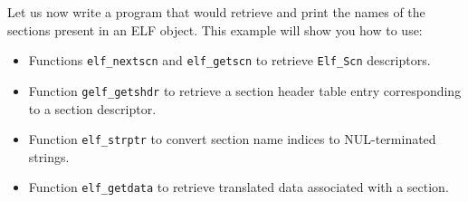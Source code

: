 \documentclass[a4paper,pdftex]{book}
\newcommand{\function}[1]{\texttt{#1}}
\newcommand{\type}[1]{\texttt{#1}}
\begin{document}
Let us now write a program that would retrieve and print the names of
the sections present in an ELF object.  This example will show you how
to use:
\begin{itemize}
\item Functions \function{elf\_nextscn} and \function{elf\_getscn} to
  retrieve \type{Elf\_Scn} descriptors.
\item Function \function{gelf\_getshdr} to retrieve a section header
  table entry corresponding to a section descriptor.%
\item Function \function{elf\_strptr} to convert section name indices
  to NUL-terminated strings.%
\item Function \function{elf\_getdata} to retrieve translated data
  associated with a section.%
\end{itemize}
\end{document}
